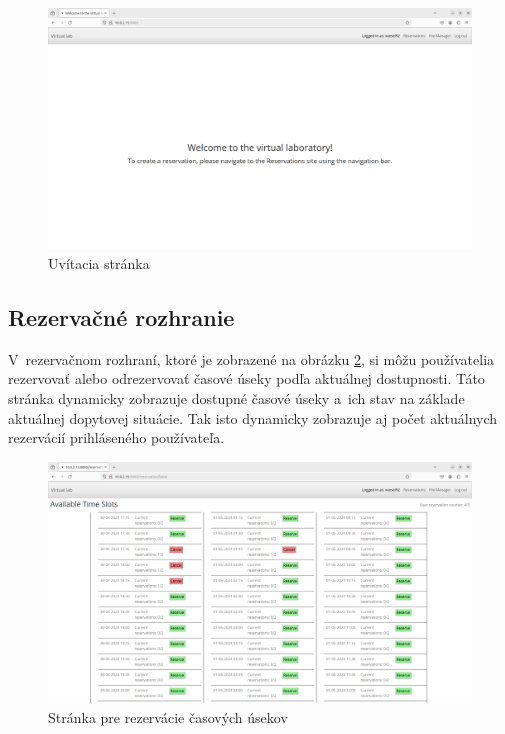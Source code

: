 \begin{figure} \label{Uvitacia obrazovka}
    \centering
    \includegraphics[width=1\linewidth]{obrazky-figures/Welcome_site.png}
    \caption{Uvítacia stránka}
\end{figure}

\subsection{Rezervačné rozhranie}

V~rezervačnom rozhraní, ktoré je zobrazené na obrázku \ref{Rezervacna obrazovka}, si môžu používatelia rezervovať alebo odrezervovať časové úseky podľa aktuálnej dostupnosti. Táto stránka dynamicky zobrazuje dostupné časové úseky a~ich stav na základe aktuálnej dopytovej situácie. Tak isto dynamicky zobrazuje aj počet aktuálnych rezervácií prihláseného používateľa. 


\begin{figure} \label{Rezervacna obrazovka}
    \centering
    \includegraphics[width=1\linewidth]{obrazky-figures/Reservations_site.png}
    \caption{Stránka pre rezervácie časových úsekov}
\end{figure}


